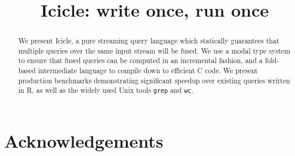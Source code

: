 \documentclass[preprint]{sigplanconf}
\begin{document}
\doi{}

\title{Icicle: write once, run once}


\maketitle
\makeatactive

\begin{abstract}
We present Icicle, a pure streaming query language which statically guarantees that multiple queries over the same input stream will be fused. We use a modal type system to ensure that fused queries can be computed in an incremental fashion, and a fold-based intermediate language to compile down to efficient C code. We present production benchmarks demonstrating significant speedup over existing queries written in R, as well as the widely used Unix tools \texttt{grep} and \texttt{wc}.

\end{abstract}






% 
% 


\section*{Acknowledgements}




% 
\end{document}
